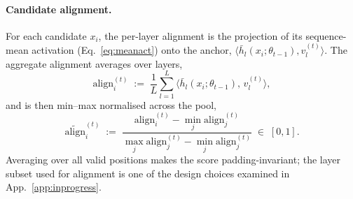 \paragraph{Candidate alignment.}
For each candidate $x_i$, the per-layer alignment is the projection
of its sequence-mean activation (Eq.~\ref{eq:meanact}) onto the
anchor, $\langle \bar h_l(x_i;\theta_{t-1}), v_l^{(t)} \rangle$. The
aggregate alignment averages over layers,
\begin{equation}
  \mathrm{align}_i^{(t)}
  \;:=\;
  \frac{1}{L}\sum_{l=1}^{L}
     \bigl\langle \bar h_l(x_i;\theta_{t-1}),\, v_l^{(t)} \bigr\rangle,
  \label{eq:align-raw}
\end{equation}
and is then min--max normalised across the pool,
\begin{equation}
  \widetilde{\mathrm{align}}_i^{(t)}
  \;:=\;
  \frac{\mathrm{align}_i^{(t)} - \min_j \mathrm{align}_j^{(t)}}
       {\max_j \mathrm{align}_j^{(t)} - \min_j \mathrm{align}_j^{(t)}}
  \;\in\; [0, 1].
  \label{eq:align}
\end{equation}
Averaging over all valid positions makes the score
padding-invariant; the layer subset used for alignment is one of
the design choices examined in App.~\ref{app:inprogress}.

